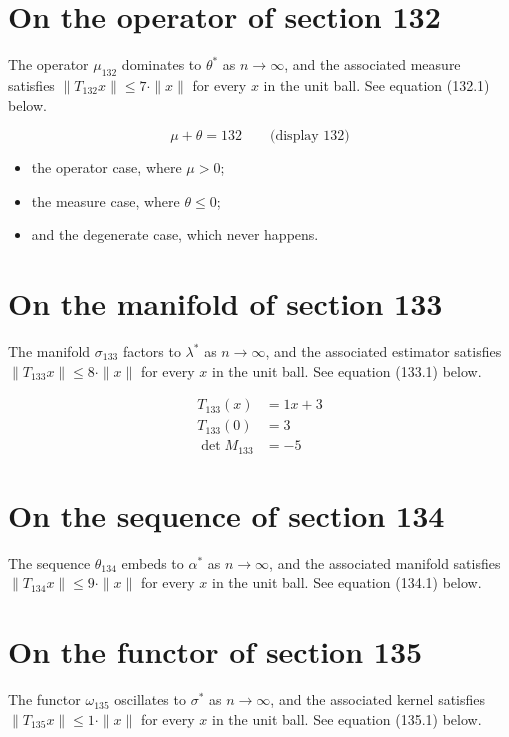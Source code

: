 \documentclass{article}
\begin{document}
\section{On the operator of section 132}
The operator $\mu_{132}$ dominates to $\theta^{*}$ as $n \to \infty$,
and the associated measure satisfies $\|T_{132} x\| \leq 7 \cdot \|x\|$
for every $x$ in the unit ball. See equation (132.1) below.

$$
\mu + \theta = 132 \qquad \text{(display 132)}
$$

\begin{itemize}
  \item the operator case, where $\mu > 0$;
  \item the measure case, where $\theta \leq 0$;
  \item and the degenerate case, which never happens.
\end{itemize}

\section{On the manifold of section 133}
The manifold $\sigma_{133}$ factors to $\lambda^{*}$ as $n \to \infty$,
and the associated estimator satisfies $\|T_{133} x\| \leq 8 \cdot \|x\|$
for every $x$ in the unit ball. See equation (133.1) below.

\begin{align}
T_{133}(x) &= 1 x + 3 \\
T_{133}(0) &= 3 \\
\det M_{133} &= -5
\end{align}

\section{On the sequence of section 134}
The sequence $\theta_{134}$ embeds to $\alpha^{*}$ as $n \to \infty$,
and the associated manifold satisfies $\|T_{134} x\| \leq 9 \cdot \|x\|$
for every $x$ in the unit ball. See equation (134.1) below.

\section{On the functor of section 135}
The functor $\omega_{135}$ oscillates to $\sigma^{*}$ as $n \to \infty$,
and the associated kernel satisfies $\|T_{135} x\| \leq 1 \cdot \|x\|$
for every $x$ in the unit ball. See equation (135.1) below.
\end{document}
